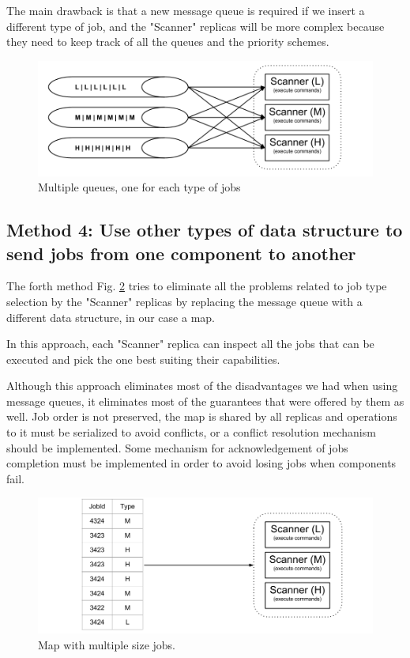 The main drawback is that a new message queue is required if we insert a different type of job, and the "Scanner" replicas will be more complex because they need to keep track of all the queues and the priority schemes.

\begin{figure}[ht]
\centering
\includegraphics[width=\linewidth]{./img/3_MultipleQueueLoadBalancing.png}
\caption{Multiple queues, one for each type of jobs}
\label{fig:multipleQueueDistributionOfTasks}
\end{figure}

\subsection{Method 4: Use other types of data structure to send jobs from one component to another}
\label{subsection:method4}

The forth method Fig. \ref{fig:mapDistributionOfTasks} tries to eliminate all the problems related to job type selection by the "Scanner" replicas by replacing the message queue with a different data structure, in our case a map. 

In this approach, each "Scanner" replica can inspect all the jobs that can be executed and pick the one best suiting their capabilities.

Although this approach eliminates most of the disadvantages we had when using message queues, it eliminates most of the guarantees that were offered by them as well. Job order is not preserved, the map is shared by all replicas and operations to it must be serialized to avoid conflicts, or a conflict resolution mechanism should be implemented. Some mechanism for acknowledgement of jobs completion must be implemented in order to avoid losing jobs when components fail.

\begin{figure}[ht]
\centering
\includegraphics[width=\linewidth]{./img/4_MapOrOtherDataStructureLoadBalancing.png}
\caption{Map with multiple size jobs.}
\label{fig:mapDistributionOfTasks}
\end{figure}

